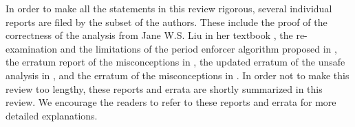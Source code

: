 In order to make all the statements in this review rigorous, several
individual reports are filed by the subset of the authors. These
include the proof \cite{ChenHuangNelissen} of the correctness of the
analysis from Jane W.S. Liu in her textbook \cite[Page
164-165]{Liu:2000:RS:518501}, the re-examination and the limitations
\cite{ChenBrandenburg} of the period enforcer algorithm proposed in
\cite{Raj:suspension1991}, the erratum report \cite{BletsasReport2015}
of the misconceptions in
\cite{ECRTS-AudsleyB04,RTAS-AudsleyB04,RTCSA-BletsasA05}, the updated
erratum \cite{erratu-cong-anderson} of the unsafe analysis in
\cite{erratu-cong-anderson}, and the erratum  of the
misconceptions in \cite{RTSS-KimANR13}.  In order not to make this
review too lengthy, these reports and errata are shortly summarized in
this review. We encourage the readers to refer to these reports and
errata for more detailed explanations.


